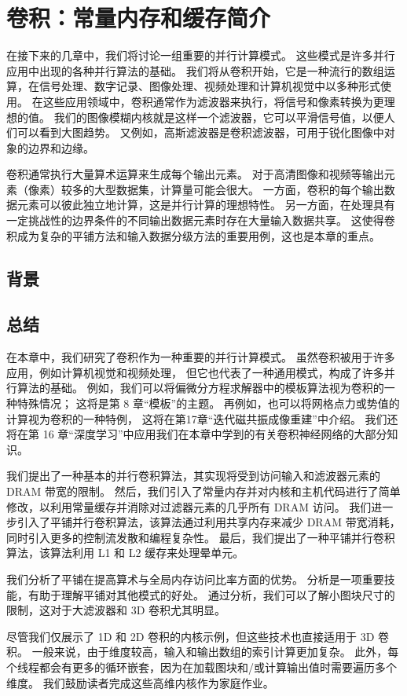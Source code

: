 \section{卷积：常量内存和缓存简介}
在接下来的几章中，我们将讨论一组重要的并行计算模式。 这些模式是许多并行应用中出现的各种并行算法的基础。 
我们将从卷积开始，它是一种流行的数组运算，在信号处理、数字记录、图像处理、视频处理和计算机视觉中以多种形式使用。 
在这些应用领域中，卷积通常作为滤波器来执行，将信号和像素转换为更理想的值。 
我们的图像模糊内核就是这样一个滤波器，它可以平滑信号值，以便人们可以看到大图趋势。 
又例如，高斯滤波器是卷积滤波器，可用于锐化图像中对象的边界和边缘。

卷积通常执行大量算术运算来生成每个输出元素。 对于高清图像和视频等输出元素（像素）较多的大型数据集，计算量可能会很大。 
一方面，卷积的每个输出数据元素可以彼此独立地计算，这是并行计算的理想特性。 
另一方面，在处理具有一定挑战性的边界条件的不同输出数据元素时存在大量输入数据共享。 
这使得卷积成为复杂的平铺方法和输入数据分级方法的重要用例，这也是本章的重点。

\subsection{背景}

\subsection{总结}
在本章中，我们研究了卷积作为一种重要的并行计算模式。 虽然卷积被用于许多应用，例如计算机视觉和视频处理，
但它也代表了一种通用模式，构成了许多并行算法的基础。 例如，我们可以将偏微分方程求解器中的模板算法视为卷积的一种特殊情况； 
这将是第 8 章“模板”的主题。 再例如，也可以将网格点力或势值的计算视为卷积的一种特例，
这将在第17章“迭代磁共振成像重建”中介绍。 
我们还将在第 16 章“深度学习”中应用我们在本章中学到的有关卷积神经网络的大部分知识。

我们提出了一种基本的并行卷积算法，其实现将受到访问输入和滤波器元素的 DRAM 带宽的限制。 
然后，我们引入了常量内存并对内核和主机代码进行了简单修改，以利用常量缓存并消除对过滤器元素的几乎所有 DRAM 访问。 
我们进一步引入了平铺并行卷积算法，该算法通过利用共享内存来减少 DRAM 带宽消耗，同时引入更多的控制流发散和编程复杂性。 
最后，我们提出了一种平铺并行卷积算法，该算法利用 L1 和 L2 缓存来处理晕单元。

我们分析了平铺在提高算术与全局内存访问比率方面的优势。 分析是一项重要技能，有助于理解平铺对其他模式的好处。 
通过分析，我们可以了解小图块尺寸的限制，这对于大滤波器和 3D 卷积尤其明显。

尽管我们仅展示了 1D 和 2D 卷积的内核示例，但这些技术也直接适用于 3D 卷积。 
一般来说，由于维度较高，输入和输出数组的索引计算更加复杂。 
此外，每个线程都会有更多的循环嵌套，因为在加载图块和/或计算输出值时需要遍历多个维度。 
我们鼓励读者完成这些高维内核作为家庭作业。